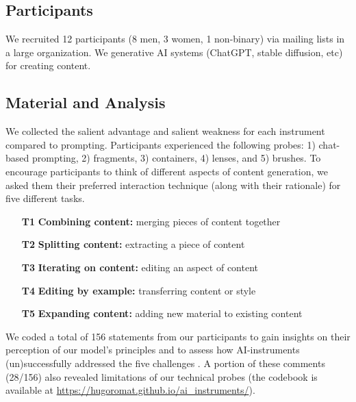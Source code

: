\subsection{Participants}
We recruited 12 participants (8 men, 3 women, 1 non-binary) via mailing lists in a large organization. We  generative AI systems (ChatGPT, stable diffusion, etc) for creating content.  

\subsection{Material and Analysis}

We collected the salient advantage and salient weakness for each instrument compared to prompting. Participants experienced the following probes: 1) chat-based prompting, 2) fragments, 3) containers, 4) lenses, and 5) brushes. To encourage participants to think of different aspects of content generation, we asked them their preferred interaction technique (along with their rationale) for five different tasks. 

\begin{enumerate}[leftmargin=*]
    \item [\textbf{T1}] \textbf{Combining content:} merging pieces of content together
    \item [\textbf{T2}] \textbf{Splitting content:} extracting a piece of content
    \item [\textbf{T3}] \textbf{Iterating on content:} editing an aspect of content  
    \item [\textbf{T4}] \textbf{Editing by example:} transferring content or style
    \item [\textbf{T5}] \textbf{Expanding content:} adding new material to existing content
\end{enumerate}

We coded a total of 156 statements from our participants to gain insights on their perception of our model's principles and to assess how AI-instruments (un)successfully addressed the five challenges . A portion of these comments (28/156) also revealed limitations of our technical probes (the codebook is available at \url{https://hugoromat.github.io/ai_instruments/}).

